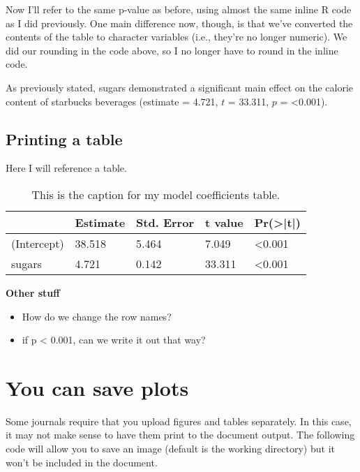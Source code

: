 \documentclass[
  12pt,
  oneside]{book}
\providecommand{\tightlist}{%
  \setlength{\itemsep}{0pt}\setlength{\parskip}{0pt}}
\numberwithin{figure}{chapter}
\begin{document}
Now I'll refer to the same p-value as before, using almost the same inline R code as I did previously. One main difference now, though, is that we've converted the contents of the table to character variables (i.e., they're no longer numeric). We did our rounding in the code above, so I no longer have to round in the inline code.

As previously stated, sugars demonstrated a significant main effect on the calorie content of starbucks beverages
(estimate = 4.721,
\(t\) = 33.311,
\(p\) = \textless0.001).

\hypertarget{printing-a-table}{%
\subsection{Printing a table}\label{printing-a-table}}

Here I will reference a table.

\begin{table}[t]

\caption{\label{tab:mod1Coefs}This is the caption for my model coefficients table.}
\centering
\begin{tabular}{l|l|l|l|l}
\hline
  & Estimate & Std. Error & t value & Pr(>|t|)\\
\hline
(Intercept) & 38.518 & 5.464 & 7.049 & <0.001\\
\hline
sugars & 4.721 & 0.142 & 33.311 & <0.001\\
\hline
\end{tabular}
\end{table}

\textbf{Other stuff}

\begin{itemize}
\tightlist
\item
  How do we change the row names?
\item
  if p \textless{} 0.001, can we write it out that way?
\end{itemize}

\hypertarget{you-can-save-plots}{%
\section{You can save plots}\label{you-can-save-plots}}

Some journals require that you upload figures and tables separately. In this case, it may not make sense to have them print to the document output. The following code will allow you to save an image (default is the working directory) but it won't be included in the document.
\end{document}
